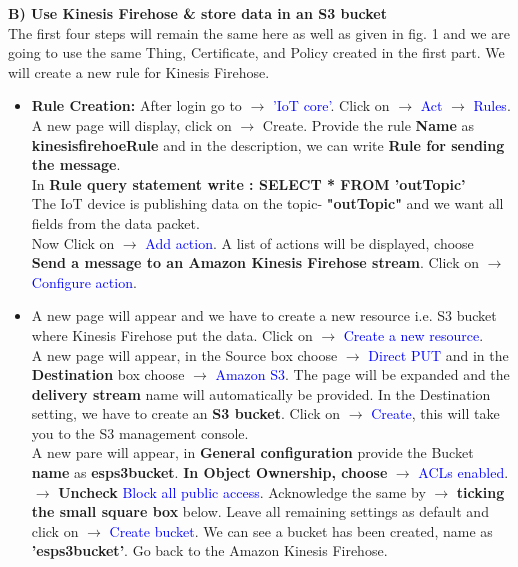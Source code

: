 \documentclass[12pt,a4paper]{article}
\begin{document}
\begin{justify}
\begin{itemize}
\end{itemize}

\noindent  \textbf{B)	Use Kinesis Firehose \& store data in an S3 bucket}\\
The first four steps will remain the same here as well as given in fig. 1 and we are going to use the same Thing, Certificate, and Policy created in the first part. We will create a new rule for Kinesis Firehose.

\vspace{-3mm}
\begin{itemize}
 \setlength\itemsep{-0.3em}
\item \textbf{Rule Creation:}
After login go to $ \rightarrow $ \textcolor{blue}{'IoT core'}. Click on $ \rightarrow $ \textcolor{blue}{Act} $ \rightarrow $ \textcolor{blue}{Rules}.\\[4pt]
A new page will display, click on $ \rightarrow $ Create. Provide the rule \textbf{Name} as \textbf{kinesisfirehoeRule} and in the description, we can write \textbf{Rule for sending the message}.\\[4pt]
In \textbf{Rule query statement write :  SELECT * FROM 'outTopic'} \\[4pt]
The IoT device is publishing data on the topic- \textbf{"outTopic"} and we want all fields from the data packet.\\[4pt]
 Now Click on $ \rightarrow $ \textcolor{blue}{Add action}. A list of actions will be displayed, choose \textbf{Send a message to an Amazon Kinesis Firehose stream}. Click on $ \rightarrow $ \textcolor{blue}{Configure action}.\\[6pt]
 
\item  A new page will appear and we have to create a new resource i.e. S3 bucket where Kinesis Firehose put the data. Click on $ \rightarrow $ \textcolor{blue}{Create a new resource}.\\[4pt]
A new page will appear, in the Source box choose $ \rightarrow $ \textcolor{blue}{Direct PUT} and in the \textbf{Destination} box choose $ \rightarrow $ \textcolor{blue}{Amazon S3}. The page will be expanded and the \textbf{delivery stream} name will automatically be provided. In the Destination setting, we have to create an \textbf{S3 bucket}. Click on $ \rightarrow $ \textcolor{blue}{Create}, this will take you to the S3 management console.\\[4pt]
A new pare will appear, in \textbf{General configuration} provide the Bucket \textbf{name} as \textbf{esps3bucket}. \textbf{In Object Ownership, choose} $ \rightarrow $ \textcolor{blue}{ACLs enabled}.$ \rightarrow $ \textbf{Uncheck} \textcolor{blue}{Block all public access}. Acknowledge the same by $ \rightarrow $ \textbf{ticking the small square box} below. Leave all remaining settings as default and click on $ \rightarrow $ \textcolor{blue}{Create bucket}. We can see a bucket has been created, name as \textbf{'esps3bucket'}. Go back to the Amazon Kinesis Firehose.\\[6pt]
 




\end{itemize}
\end{justify}
\end{document}

